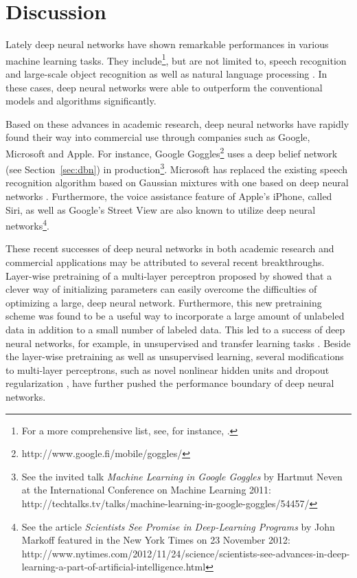 \documentclass[dissertation,nocontribution,draft*]{aaltoseries}
\begin{document}
\chapter{Discussion}
\label{chap:discussion}

Lately deep neural networks have shown remarkable
performances in various machine learning tasks. They
include\footnote{For a more comprehensive list, see, for
instance, \citep{Bengio2013pami}.  }, but are not
limited to, speech recognition \citep[see,
e.g.,][]{Hinton2012sp,Dahl2012} and large-scale object
recognition \citep[see, e.g.,][]{Krizhevsky2012,Hinton2012}
as well as natural language processing \citep[see,
e.g.,][]{Socher2011}. In these cases, deep neural networks
were able to outperform the conventional models and
algorithms significantly.

Based on these advances in academic research, deep neural
networks have rapidly found their way into commercial use
through companies such as Google, Microsoft and Apple.  For
instance, Google Goggles\footnote{
http://www.google.fi/mobile/goggles/ } uses a deep belief
network (see Section~\ref{sec:dbn}) in
production\footnote{See the invited talk \textit{Machine
Learning in Google Goggles} by Hartmut Neven at the
International Conference on Machine Learning 2011:
http://techtalks.tv/talks/machine-learning-in-google-goggles/54457/}.
Microsoft has replaced the existing speech recognition
algorithm based on Gaussian mixtures with one based on deep
neural networks \citep{Deng2013}. Furthermore, the voice
assistance feature of Apple's iPhone, called Siri, as well
as Google's Street View are also known to utilize deep
neural networks\footnote{See the article \textit{Scientists
See Promise in Deep-Learning Programs} by John Markoff
featured in the New York Times on 23 November 2012: \\
http://www.nytimes.com/2012/11/24/science/scientists-see-advances-in-deep-learning-a-part-of-artificial-intelligence.html
}.

These recent successes of deep neural networks in both
academic research and commercial applications may be
attributed to several recent breakthroughs. Layer-wise
pretraining of a multi-layer perceptron proposed by
\citep{Hinton2006,Bengio2007nips,Ranzato2007} showed that a
clever way of initializing parameters can easily overcome
the difficulties of optimizing a large, deep neural network.
Furthermore, this new pretraining scheme was found to be a
useful way to incorporate a large amount of unlabeled data
in addition to a small number of labeled data. This led to a
success of deep neural networks, for example, in
unsupervised and transfer learning tasks \citep[see,
e.g.,]{Guyon2011,Mesnil2012,Raina2007}. Beside the
layer-wise pretraining as well as unsupervised learning,
several modifications to multi-layer perceptrons, such as
novel nonlinear hidden units \citep[see,
e.g.,][]{Nair2010,Glorot2011,Goodfellow2013} and dropout
regularization \citep{Hinton2012}, have further pushed the
performance boundary of deep neural networks. 
\end{document}
